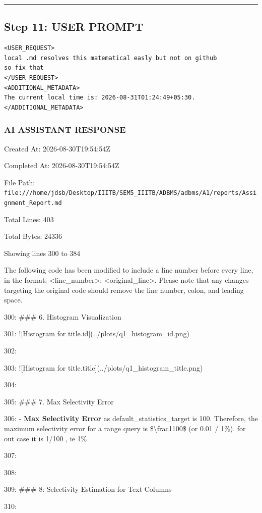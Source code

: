 \documentclass[11pt,a4paper]{article}
\begin{document}
{\hrule

\subsection{Step 11: USER PROMPT}

\begin{lstlisting}[language=text]
<USER_REQUEST>
local .md resolves this matematical easly but not on github 
so fix that 
</USER_REQUEST>
<ADDITIONAL_METADATA>
The current local time is: 2026-08-31T01:24:49+05:30.
</ADDITIONAL_METADATA>
\end{lstlisting}


\subsubsection{AI ASSISTANT RESPONSE}

Created At: 2026-08-30T19:54:54Z

Completed At: 2026-08-30T19:54:54Z

File Path: \texttt{file:///home/jdsb/Desktop/IIITB/SEM5\_IIITB/ADBMS/adbms/A1/reports/Assignment\_Report.md}

Total Lines: 403

Total Bytes: 24336

Showing lines 300 to 384

The following code has been modified to include a line number before every line, in the format: <line\_number>: <original\_line>. Please note that any changes targeting the original code should remove the line number, colon, and leading space.

300: \#\#\# 6. Histogram Visualization

301: ![Histogram for title.id](../plots/q1\_histogram\_id.png)

302:

303: ![Histogram for title.title](../plots/q1\_histogram\_title.png)

304:

305: \#\#\# 7. Max Selectivity Error

306: - \textbf{Max Selectivity Error} as default\_statistics\_target is 100. Therefore, the maximum selectivity error for a range query is \$\textbackslash{}frac{1}{100}\$ (or 0.01 / 1\%). for out case it is 1/100 , ie 1\%

307:

308:

309: \#\#\# 8: Selectivity Estimation for Text Columns

310:

}
\end{document}
